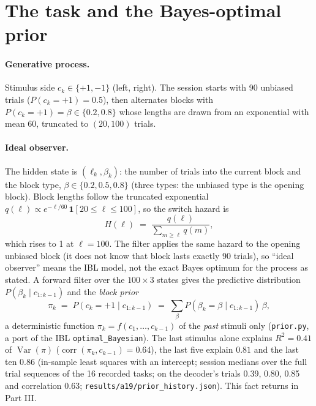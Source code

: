 \documentclass[11pt]{article}
\newcommand{\Var}{\operatorname{Var}}
\newcommand{\corr}{\operatorname{corr}}
\begin{document}
\section{The task and the Bayes-optimal prior}

\paragraph{Generative process.} Stimulus side $c_k \in \{+1, -1\}$ (left, right). The session starts with 90
unbiased trials ($P(c_k = +1) = 0.5$), then alternates blocks with $P(c_k = +1) = \beta \in \{0.2, 0.8\}$ whose lengths
are drawn from an exponential with mean 60, truncated to $(20, 100)$ trials.

\paragraph{Ideal observer.} The hidden state is $(\ell_k, \beta_k)$: the number of trials into the current block and
the block type, $\beta \in \{0.2, 0.5, 0.8\}$ (three types: the unbiased type is the opening block). Block lengths
follow the truncated exponential $q(\ell) \propto e^{-\ell/60}\,\mathbf 1[20 \le \ell \le 100]$, so the switch hazard is
\begin{equation}
H(\ell) \;=\; \frac{q(\ell)}{\sum_{m \ge \ell} q(m)},
\end{equation}
which rises to 1 at $\ell = 100$. The filter applies the same hazard to the opening unbiased block (it does not know
that block lasts exactly 90 trials), so ``ideal observer'' means the IBL model, not the exact Bayes optimum for the
process as stated. A forward filter over the $100 \times 3$ states gives the predictive distribution
$P(\beta_k \mid c_{1:k-1})$ and the \emph{block prior}
\begin{equation}
\pi_k \;=\; P(c_k = +1 \mid c_{1:k-1}) \;=\; \sum_{\beta} P(\beta_k = \beta \mid c_{1:k-1})\, \beta,
\label{eq:prior}
\end{equation}
a deterministic function $\pi_k = f(c_1, \dots, c_{k-1})$ of the \emph{past} stimuli only (\texttt{prior.py}, a port of
the IBL \texttt{optimal\_Bayesian}). The last stimulus alone explains $R^2 = 0.41$ of $\Var(\pi)$
($\corr(\pi_k, c_{k-1}) = 0.64$), the last five explain $0.81$ and the last ten $0.86$ (in-sample least squares with
an intercept; session medians over the full trial sequences of the 16 recorded tasks; on the decoder's trials 0.39,
0.80, 0.85 and correlation 0.63; \texttt{results/a19/prior\_history.json}). This fact returns in Part III.
\end{document}
